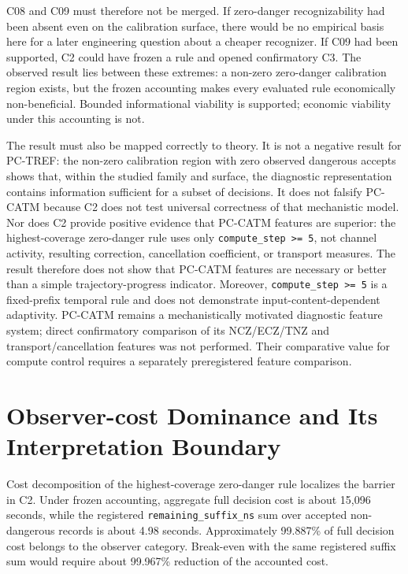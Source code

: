 C08 and C09 must therefore not be merged. If zero-danger recognizability had been absent
even on the calibration surface, there would be no empirical basis here for a later
engineering question about a cheaper recognizer. If C09 had been supported, C2 could
have frozen a rule and opened confirmatory C3. The observed result lies between these
extremes: a non-zero zero-danger calibration region exists, but the frozen accounting
makes every evaluated rule economically non-beneficial. Bounded informational
viability is supported; economic viability under this accounting is not.

The result must also be mapped correctly to theory. It is not a negative result for
PC-TREF: the non-zero calibration region with zero observed dangerous accepts shows
that, within the studied family and surface, the diagnostic representation contains
information sufficient for a subset of decisions. It does not falsify PC-CATM because
C2 does not test universal correctness of that mechanistic model. Nor does C2 provide
positive evidence that PC-CATM features are superior: the highest-coverage zero-danger
rule uses only \texttt{compute\_step >= 5}, not channel activity, resulting correction,
cancellation coefficient, or transport measures. The result therefore does not show
that PC-CATM features are necessary or better than a simple trajectory-progress
indicator. Moreover, \texttt{compute\_step >= 5} is a fixed-prefix temporal rule and
does not demonstrate input-content-dependent adaptivity. PC-CATM remains a
mechanistically motivated diagnostic feature system; direct confirmatory comparison of
its NCZ/ECZ/TNZ and transport/cancellation features was not performed. Their comparative
value for compute control requires a separately preregistered feature comparison.

\section{Observer-cost Dominance and Its Interpretation Boundary}
\label{sec:discussion-observer-cost-en}

Cost decomposition of the highest-coverage zero-danger rule localizes the barrier in C2.
Under frozen accounting, aggregate full decision cost is about 15,096 seconds, while
the registered \texttt{remaining\_suffix\_ns} sum over accepted non-dangerous records
is about 4.98 seconds. Approximately 99.887\% of full decision cost belongs to the
observer category. Break-even with the same registered suffix sum would require about
99.967\% reduction of the accounted cost.

